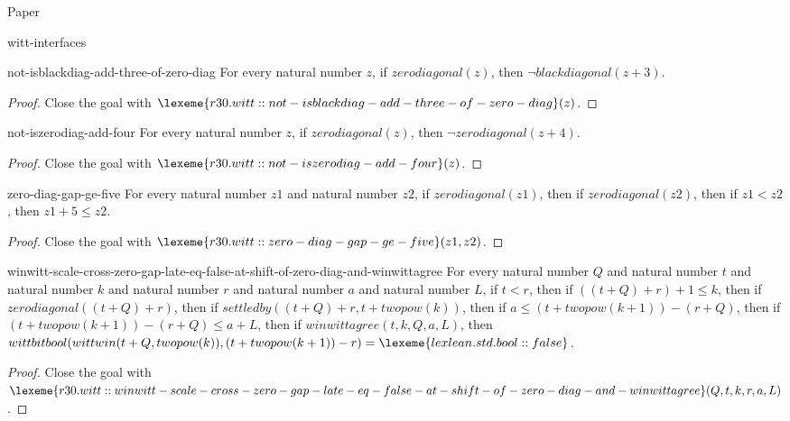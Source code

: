 \begin{lexlean}{Paper}
\begin{section}{witt-interfaces}
  \begin{theorem}{not-isblackdiag-add-three-of-zero-diag}
  For every natural number \(z\), if \(zerodiagonal(z)\), then \(¬ blackdiagonal(z + 3)\).
  \begin{proof}
  Close the goal with \(\lexeme{r30.witt::not-isblackdiag-add-three-of-zero-diag}(z)\).
  \end{proof}
  \end{theorem}

  \begin{theorem}{not-iszerodiag-add-four}
  For every natural number \(z\), if \(zerodiagonal(z)\), then \(¬ zerodiagonal(z + 4)\).
  \begin{proof}
  Close the goal with \(\lexeme{r30.witt::not-iszerodiag-add-four}(z)\).
  \end{proof}
  \end{theorem}

  \begin{theorem}{zero-diag-gap-ge-five}
  For every natural number \(z1\) and natural number \(z2\), if \(zerodiagonal(z1)\), then if \(zerodiagonal(z2)\), then if \(z1 < z2\), then \(z1 + 5 ≤ z2\).
  \begin{proof}
  Close the goal with \(\lexeme{r30.witt::zero-diag-gap-ge-five}(z1, z2)\).
  \end{proof}
  \end{theorem}

  \begin{theorem}{winwitt-scale-cross-zero-gap-late-eq-false-at-shift-of-zero-diag-and-winwittagree}
  For every natural number \(Q\) and natural number \(t\) and natural number \(k\) and natural number \(r\) and natural number \(a\) and natural number \(L\), if \(t < r\), then if \(((t + Q) + r) + 1 ≤ k\), then if \(zerodiagonal((t + Q) + r)\), then if \(settledby((t + Q) + r, t + twopow(k))\), then if \(a ≤ (t + twopow(k + 1)) - (r + Q)\), then if \((t + twopow(k + 1)) - (r + Q) ≤ a + L\), then if \(winwittagree(t, k, Q, a, L)\), then \(wittbitbool(wittwin(t + Q, twopow(k)), (t + twopow(k + 1)) - r) = \lexeme{lexlean.std.bool::false}\).
  \begin{proof}
  Close the goal with \(\lexeme{r30.witt::winwitt-scale-cross-zero-gap-late-eq-false-at-shift-of-zero-diag-and-winwittagree}(Q, t, k, r, a, L)\).
  \end{proof}
  \end{theorem}


\end{section}
\end{lexlean}
